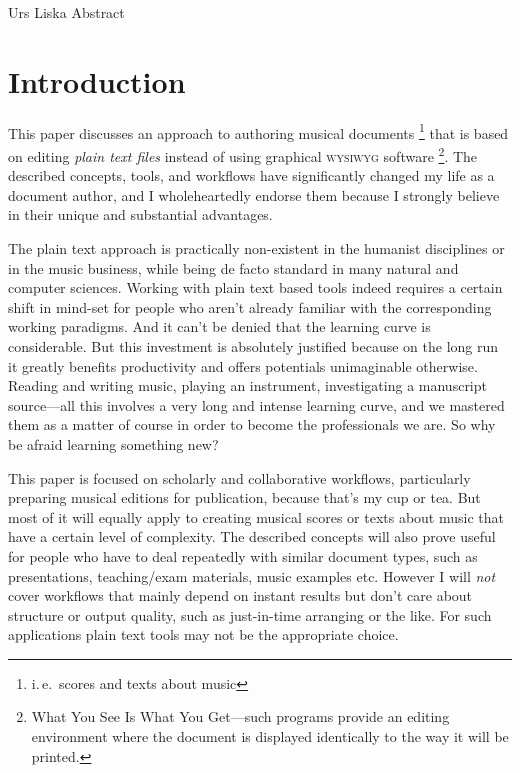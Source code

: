 \documentclass[../../LilyPond-Tutorials]{subfiles}
\begin{document}
\begin{authorAbstract}{Urs Liska}
Abstract
\end{authorAbstract}

\chapter*{Introduction}
\label{chap:pt_introduction}
This paper discusses an approach to authoring musical documents%
\footnote{i.\,e.\ scores and texts about music}
that is based on editing \emph{plain text files} instead of using graphical \textsc{wysiwyg} software%
\footnote{What You See Is What You Get---such programs provide an editing environment where the document is displayed identically to the way it will be printed.}.
The described concepts, tools, and workflows have significantly changed my life as a document author, and I  wholeheartedly endorse them because I strongly believe in their unique and substantial advantages.

The plain text approach is practically non-existent in the humanist disciplines or in the music business, while being de facto standard in many natural and computer sciences.
Working with plain text based tools indeed requires a certain shift in mind-set for people who aren't already familiar with the corresponding working paradigms.
And it can't be denied that the learning curve is considerable.
But this investment is absolutely justified because on the long run it greatly benefits productivity and offers potentials unimaginable otherwise.
Reading and writing music, playing an instrument, investigating a manuscript source---all this involves a very long and intense learning curve, and we mastered them as a matter of course in order to become the professionals we are.
So why be afraid learning something new?

This paper is focused on scholarly and collaborative workflows, particularly preparing musical editions for publication, because that's my cup or tea.
But most of it will equally apply to creating musical scores or texts about music that have a certain level of complexity.
The described concepts will also prove useful for people who have to deal repeatedly with similar document types, such as presentations, teaching/exam materials, music examples etc.
However I will \emph{not} cover workflows that mainly depend on instant results but don't care about structure or output quality, such as just-in-time arranging or the like.
For such applications plain text tools may not be the appropriate choice.
\end{document}
